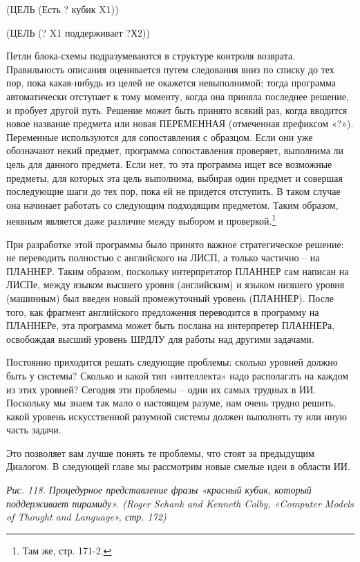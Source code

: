 \documentclass[../main.tex]{subfiles}
\begin{document}
(ЦЕЛЬ (Есть ? кубик X1))

(ЦЕЛЬ (? X1 поддерживает ?Х2))

Петли блока-схемы подразумеваются в структуре контроля возврата. Правильность описания оценивается путем следования вниз по списку до тех пор, пока какая-нибудь из целей не окажется невыполнимой; тогда программа автоматически отступает к тому моменту, когда она приняла последнее решение, и пробует другой путь. Решение может быть принято всякий раз, когда вводится новое название предмета или новая ПЕРЕМЕННАЯ (отмеченная префиксом «?»). Переменные используются для сопоставления с образцом. Если они уже обозначают некий предмет, программа сопоставления проверяет, выполнима ли цель для данного предмета. Если нет, то эта программа ищет все возможные предметы, для которых эта цель выполнима, выбирая один предмет и совершая последующие шаги до тех пор, пока ей не придется отступить. В таком случае она начинает работать со следующим подходящим предметом. Таким образом, неявным является даже различие между выбором и проверкой.\footnote{Там же, стр. 171-2.}

При разработке этой программы было принято важное стратегическое решение: не переводить полностью с английского на ЛИСП, а только частично \--- на ПЛАННЕР. Таким образом, поскольку интерпретатор ПЛАННЕР сам написан на ЛИСПе, между языком высшего уровня (английским) и языком низшего уровня (машинным) был введен новый промежуточный уровень (ПЛАННЕР). После того, как фрагмент английского предложения переводится в программу на ПЛАННЕРе, эта программа может быть послана на интерпретер ПЛАННЕРа, освобождая высший уровень ШРДЛУ для работы над другими задачами.

Постоянно приходится решать следующие проблемы: сколько уровней должно быть у системы? Сколько и какой тип «интеллекта» надо располагать на каждом из этих уровней? Сегодня эти проблемы \--- одни их самых трудных в ИИ\@. Поскольку мы знаем так мало о настоящем разуме, нам очень трудно решить, какой уровень искусственной разумной системы должен выполнять ту или иную часть задачи.

Это позволяет вам лучше понять те проблемы, что стоят за предыдущим Диалогом. В следующей главе мы рассмотрим новые смелые идеи в области ИИ.

\emph{Рис. 118. Процедурное представление фразы «красный кубик, который поддерживает пирамиду». (Roger Schank and Kenneth Colby, «Computer Models of Thought and Language», стр. 172)}
\end{document}
